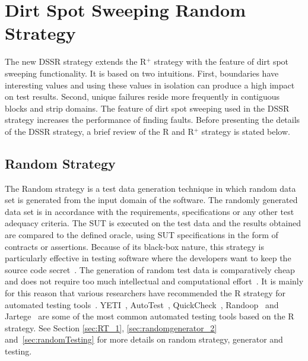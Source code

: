 
\section{Dirt Spot Sweeping Random Strategy}\label{sec:dssr}
The new DSSR strategy extends the R$^+$ strategy with the feature of dirt spot sweeping functionality. It is based on two intuitions. First, boundaries have interesting values and using these values in isolation can produce a high impact on test results. Second, unique failures reside more frequently in contiguous blocks and strip domains. The feature of dirt spot sweeping used in the DSSR strategy increases the performance of finding faults. Before presenting the details of the DSSR strategy, a brief review of the R and R$^+$ strategy is stated below.

\subsection{Random Strategy}
The Random strategy is a test data generation technique in which random data set is generated from the input domain of the software. The randomly generated data set is in accordance with the requirements, specifications or any other test adequacy criteria. The SUT is executed on the test data and the results obtained are compared to the defined oracle, using SUT specifications in the form of contracts or assertions. Because of its black-box nature, this strategy is particularly effective in testing software where the developers want to keep the source code secret~\cite{chen2010adaptive}. The generation of random test data is comparatively cheap and does not require too much intellectual and computational effort~\cite{ciupa2008finding, ciupa2011number}. It is mainly for this reason that various researchers have recommended the R strategy for automated testing tools~\cite{ciupa2008artoo}.
 YETI~\cite{oriol2010yeti, oriol2012random}, AutoTest~\cite{leitner2007reconciling, ciupa2007experimental}, QuickCheck~\cite{claessen2011quickcheck}, Randoop~\cite{pacheco2007randoop, pacheco2007feedback} and Jartege~\cite{oriat2005jartege} are some of the most common automated testing tools based on the R strategy. See Section \ref{sec:RT_1}, \ref{sec:randomgenerator_2} and~\ref{sec:randomTesting} for more details on random strategy, generator and testing.


